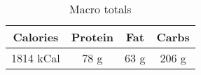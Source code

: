 \documentclass{report}
\begin{document}
\begin{multicols}{2}
\begin{enumerate}
\begin{table}[H]
  \begin{center}
    \caption{Macro totals}
    \label{tab:table1}
    \begin{tabular}{c|c|c|c} %
      \textbf{Calories} & \textbf{Protein} & \textbf{Fat} & \textbf{Carbs}\\
      \hline
      1814 kCal & 78 g & 63 g & 206 g\\
    \end{tabular}
  \end{center}
\end{table}
 
\end{enumerate}
\end{multicols}




\end{document}

